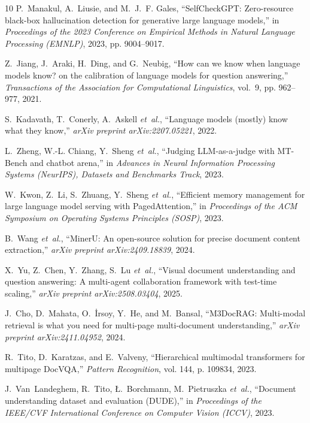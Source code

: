 \documentclass[pdflatex,sn-basic]{sn-jnl}%
\theoremstyle{thmstyletwo}%
\begin{document}
\begin{thebibliography}{10}
P.~Manakul, A.~Liusie, and M.~J.~F. Gales, ``{SelfCheckGPT}: Zero-resource
  black-box hallucination detection for generative large language models,'' in
  \emph{Proceedings of the 2023 Conference on Empirical Methods in Natural
  Language Processing (EMNLP)}, 2023, pp. 9004--9017.

Z.~Jiang, J.~Araki, H.~Ding, and G.~Neubig, ``How can we know when language
  models know? on the calibration of language models for question answering,''
  \emph{Transactions of the Association for Computational Linguistics}, vol.~9,
  pp. 962--977, 2021.

S.~Kadavath, T.~Conerly, A.~Askell \emph{et~al.}, ``Language models (mostly)
  know what they know,'' \emph{arXiv preprint arXiv:2207.05221}, 2022.

L.~Zheng, W.-L. Chiang, Y.~Sheng \emph{et~al.}, ``Judging {LLM}-as-a-judge with
  {MT-Bench} and chatbot arena,'' in \emph{Advances in Neural Information
  Processing Systems (NeurIPS), Datasets and Benchmarks Track}, 2023.

W.~Kwon, Z.~Li, S.~Zhuang, Y.~Sheng \emph{et~al.}, ``Efficient memory
  management for large language model serving with {PagedAttention},'' in
  \emph{Proceedings of the ACM Symposium on Operating Systems Principles
  (SOSP)}, 2023.

B.~Wang \emph{et~al.}, ``{MinerU}: An open-source solution for precise document
  content extraction,'' \emph{arXiv preprint arXiv:2409.18839}, 2024.

X.~Yu, Z.~Chen, Y.~Zhang, S.~Lu \emph{et~al.}, ``Visual document understanding
  and question answering: A multi-agent collaboration framework with test-time
  scaling,'' \emph{arXiv preprint arXiv:2508.03404}, 2025.

J.~Cho, D.~Mahata, O.~{\.I}rsoy, Y.~He, and M.~Bansal, ``{M3DocRAG}:
  Multi-modal retrieval is what you need for multi-page multi-document
  understanding,'' \emph{arXiv preprint arXiv:2411.04952}, 2024.

R.~Tito, D.~Karatzas, and E.~Valveny, ``Hierarchical multimodal transformers
  for multipage {DocVQA},'' \emph{Pattern Recognition}, vol. 144, p. 109834,
  2023.

J.~Van~Landeghem, R.~Tito, {\L}.~Borchmann, M.~Pietruszka \emph{et~al.},
  ``Document understanding dataset and evaluation ({DUDE}),'' in
  \emph{Proceedings of the IEEE/CVF International Conference on Computer Vision
  (ICCV)}, 2023.


\end{thebibliography}
\end{document}
